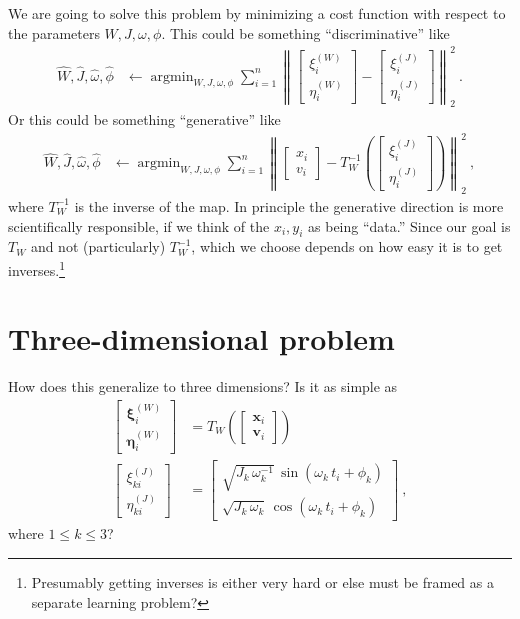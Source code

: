 \documentclass{article}
\DeclareMathOperator*{\argmin}{argmin}
\newcommand{\norm}[1]{\left\lVert#1\right\rVert_2^2}
\begin{document}
We are going to solve this problem by minimizing a cost function with respect to the parameters $W,J,\omega,\phi$.
This could be something ``discriminative'' like
\begin{align}
    \hat{W},\hat{J},\hat{\omega},\hat{\phi} &\leftarrow \argmin_{W,J,\omega,\phi} \sum_{i=1}^n\norm{\begin{bmatrix}\xi^{(W)}_i \\ \eta^{(W)}_i\end{bmatrix} - \begin{bmatrix}\xi^{(J)}_i \\ \eta^{(J)}_i\end{bmatrix}} ~.
\end{align}
Or this could be something ``generative'' like
\begin{align}
    \hat{W},\hat{J},\hat{\omega},\hat{\phi} &\leftarrow \argmin_{W,J,\omega,\phi} \sum_{i=1}^n\norm{\begin{bmatrix}x_i \\ v_i\end{bmatrix} - T_W^{-1}(\begin{bmatrix}\xi^{(J)}_i \\ \eta^{(J)}_i\end{bmatrix})} ~,
\end{align}
where $T_W^{-1}$ is the inverse of the map.
In principle the generative direction is more scientifically responsible, if we think of the $x_i, y_i$ as being ``data.''
Since our goal is $T_W$ and not (particularly) $T_W^{-1}$, which we choose depends on how easy it is to get inverses.\footnote{Presumably getting inverses is either very hard or else must be framed as a separate learning problem?}

\section{Three-dimensional problem}
How does this generalize to three dimensions?
Is it as simple as
\begin{align}
    \begin{bmatrix}\boldsymbol{\xi}^{(W)}_i \\ \boldsymbol{\eta}^{(W)}_i\end{bmatrix} &= T_W(\begin{bmatrix}\boldsymbol{x}_i \\ \boldsymbol{v}_i\end{bmatrix}) \\
    \begin{bmatrix}\xi^{(J)}_{ki} \\ \eta^{(J)}_{ki}\end{bmatrix} &= \begin{bmatrix}\sqrt{J_k\,\omega_k^{-1}}\,\sin(\omega_k\,t_i+\phi_k) \\ \sqrt{J_k\,\omega_k}\,\cos(\omega_k\,t_i+\phi_k)\end{bmatrix} ~,
\end{align}
where $1\leq k\leq 3$?
\end{document}
